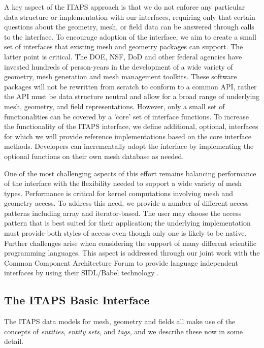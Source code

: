 A key aspect of the ITAPS approach is that we do not enforce any
particular data structure or implementation with our interfaces,
requiring only that certain questions about the geometry, mesh, or
field data can be answered through calls to the interface.  To
encourage adoption of the interface, we aim to create a small set of
interfaces that existing mesh and geometry packages can support.  The
latter point is critical.  The DOE, NSF, DoD and other federal
agencies have invested hundreds of person-years in the development of
a wide variety of geometry, mesh generation and mesh management
toolkits.  These software packages will not be rewritten from scratch
to conform to a common API, rather the API must be data structure
neutral and allow for a broad range of underlying mesh, geometry, and
field representations. However, only a small set of functionalities
can be covered by a 'core' set of interface functions.  To increase
the functionality of the ITAPS interface, we define additional,
optional, interfaces for which we will provide reference
implementations based on the core interface methods.  Developers can
incrementally adopt the interface by implementing the optional
functions on their own mesh database as needed.

One of the most challenging aspects of this effort remains balancing
performance of the interface with the flexibility needed to support a
wide variety of mesh types.  Performance is critical for kernel
computations involving mesh and geometry access.  To address this
need, we provide a number of different access patterns including array
and iterator-based.  The user may choose the access pattern that is
best suited for their application; the underlying implementation must
provide both styles of access even though only one is likely to be
native.  Further challenges arise when considering the support of many
different scientific programming languages.  This aspect is addressed
through our joint work with the Common Component Architecture Forum
\cite{cca-forum} to provide
language independent interfaces by using their SIDL/Babel technology
\cite{babel}.  


\subsection{The ITAPS Basic Interface}
\label{sec:utilities}

The ITAPS data models for mesh, geometry and fields all make use of the
concepts of {\it entities}, {\it entity sets}, and {\it tags}, and we
describe these now in some detail.

